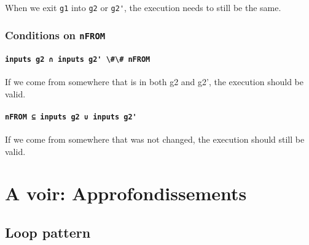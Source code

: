 \documentclass[11pt]{article}
\newcommand{\inlinecoq}[1]{\mbox{\lstinline[style=customcoq,columns=fixed,basewidth=.48em]{#1}}}
\newcommand{\ilc}[1]{\inlinecoq{#1}}
\begin{document}
When we exit \ilc{g1} into \ilc{g2} or \ilc{g2'}, the execution needs to still be the same.

\subsubsection{Conditions on \ilc{nFROM}}

\paragraph{\ilc{inputs g2 ∩ inputs g2' \#\# nFROM}}

If we come from somewhere that is in both g2 and g2', the execution should be valid.

\paragraph{\ilc{nFROM ⊆ inputs g2 ∪ inputs g2'}}

If we come from somewhere that was not changed, the execution should still be valid.

\section{A voir: Approfondissements}
\label{sec:appr}

\subsection{Loop pattern}



\end{document}
